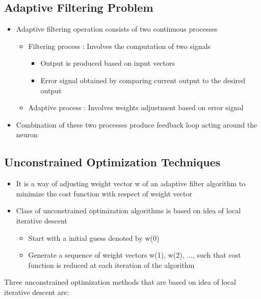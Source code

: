 \documentclass[12pt]{article}
\begin{document}
\subsection{Adaptive Filtering Problem}
	\begin{itemize}
		\item Adaptive filtering operation consists of two continuous processes
			\begin{itemize}
				\item Filtering process : Involves the computation of two signals
					\begin{itemize}
						\item Output is produced based on input vectors
						\item Error signal obtained by comparing current output to the desired output
					\end{itemize}
				\item Adaptive process : Involves weights adjustment based on error signal 
			\end{itemize}
		\item Combination of these two processes produce feedback loop acting around the neuron
	\end{itemize}
\subsection{Unconstrained Optimization Techniques}
\begin{itemize}
	\item It is a way of adjusting weight vector w of an adaptive filter algorithm to minimize the cost function with respect of weight vector
	\item Class of unconstrained optimization algorithms is based on idea of local iterative descent
		\begin{itemize}
			\item Start with a initial guess denoted by w(0)
			\item Generate a sequence of weight vectors w(1), w(2), ..., such that cost function is reduced at each iteration of the algorithm
			
		\end{itemize}
\end{itemize}
Three unconstrained optimization methods that are based on idea of local iterative descent are:
\end{document}
